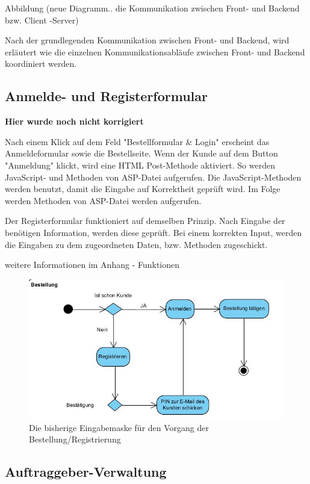 Abbildung (neue Diagramm.. die Kommunikation zwischen Front- und Backend bzw. Client -Server)

Nach der grundlegenden Kommunikation zwischen Front- und Backend, wird erläutert wie die einzelnen Kommunikationsabläufe zwischen Front- und Backend koordiniert werden.

\subsection{Anmelde- und Registerformular} 

\textbf{Hier wurde noch nicht korrigiert}

Nach einem Klick auf dem Feld "Bestellformular \& Login" erscheint das Anmeldeformular sowie die Bestellseite. Wenn der Kunde auf dem Button "Anmeldung" klickt, wird eine HTML Post-Methode aktiviert. So werden JavaScript- und Methoden von ASP-Datei aufgerufen. Die JavaScript-Methoden werden benutzt, damit die Eingabe auf Korrektheit geprüft wird. Im Folge werden Methoden von ASP-Datei werden aufgerufen. 

Der Registerformular funktioniert auf demselben Prinzip. Nach Eingabe der benötigen Information, werden diese geprüft. Bei einem korrekten Input, werden die Eingaben zu dem zugeordneten Daten, bzw. Methoden zugeschickt.

weitere Informationen im Anhang - Funktionen

\begin{figure}[h]
	\centering
	\includegraphics[width=0.9\linewidth]{Graphics/Bestellung.JPG}
	\caption[Anmeldung/Bestellung]{Die bisherige Eingabemaske für den Vorgang der Bestellung/Registrierung}
	\label{fig:Bestellung}
\end{figure}

\subsection{Auftraggeber-Verwaltung}

